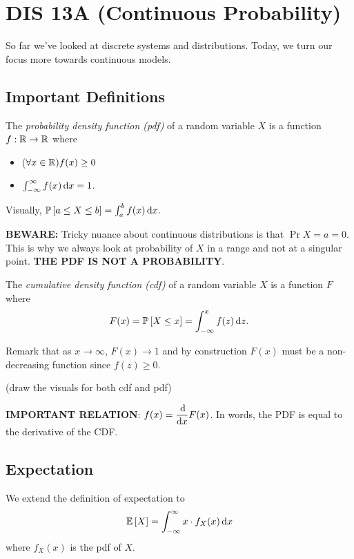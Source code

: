 \section{DIS 13A (Continuous Probability)}

So far we've looked at discrete systems and distributions. Today, we turn our focus more towards continuous models. 

\subsection{Important Definitions}

\begin{definition}
    The \textit{probability density function (pdf)} of a random variable $X$ is a function $f: \operatorname{\mathbb{R}} \to \operatorname{\mathbb{R}}$ where \begin{itemize}
        \item ($\forall x \in \operatorname{\mathbb{R}}) f(x) \ge 0$
        \item $\int_{-\infty}^{\infty} f(x) \operatorname{d\!} x = 1$.
    \end{itemize}
\end{definition}

Visually, $\mathbb{P}\left[ a \le X \le b \right] = \int_{a}^{b} f(x) \operatorname{d\!} x.$

\textbf{BEWARE:} Tricky nuance about continuous distributions is that $\Pr{X = a} = 0$. This is why we always look at probability of $X$ in a range and not at a singular point. \textbf{THE PDF IS NOT A PROBABILITY}.

\begin{definition}
    The \textit{cumulative density function (cdf)} of a random variable $X$ is a function $F$ where \[ F(x) = \mathbb{P}\left[ X \le x \right] = \int_{-\infty}^{x} f(z) \operatorname{d\!} z. \]
\end{definition}

Remark that as $x \to \infty$, $F(x) \to 1$ and by construction $F(x)$ must be a non-decreasing function since $f(z) \ge 0$. 

(draw the visuals for both cdf and pdf)

\textbf{IMPORTANT RELATION}: $\displaystyle f(x) = \frac{\operatorname{d\!}}{\operatorname{d\!} x} F(x)$. In words, the PDF is equal to the derivative of the CDF. 

\subsection{Expectation}
We extend the definition of expectation to \[ \mathbb{E}\left[ X \right] = \int_{-\infty}^{\infty} x \cdot f_{X}(x) \operatorname{d\!} x \] where $f_X(x)$ is the pdf of $X$. 

